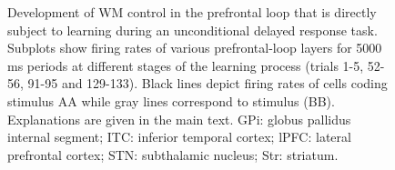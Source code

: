 \documentclass[
  11pt,
  a4paper,
]{scrbook}
\begin{document}
\begin{figure}


\caption{\label{fig-nn:fig7}Development of WM control in the prefrontal
loop that is directly subject to learning during an unconditional
delayed response task. Subplots show firing rates of various
prefrontal-loop layers for 5000 ms periods at different stages of the
learning process (trials 1-5, 52-56, 91-95 and 129-133). Black lines
depict firing rates of cells coding stimulus AA while gray lines
correspond to stimulus (BB). Explanations are given in the main text.
GPi: globus pallidus internal segment; ITC: inferior temporal cortex;
lPFC: lateral prefrontal cortex; STN: subthalamic nucleus; Str:
striatum.}

\end{figure}%
\end{document}
